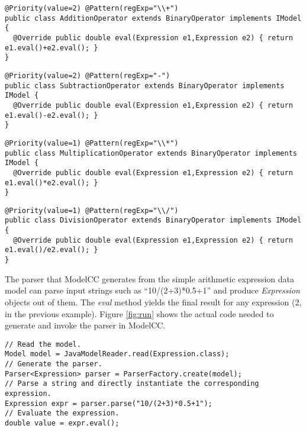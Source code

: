 \documentclass[preprint]{elsarticle}
\newcommand{\sepv}{\vspace{-6.0mm}}
\begin{document}
\begin{figure*}[tb!]
\begin{verbatim}
@Priority(value=2) @Pattern(regExp="\\+")
public class AdditionOperator extends BinaryOperator implements IModel {
  @Override public double eval(Expression e1,Expression e2) { return e1.eval()+e2.eval(); }
}
\end{verbatim}
\sepv
\begin{verbatim}
@Priority(value=2) @Pattern(regExp="-")
public class SubtractionOperator extends BinaryOperator implements IModel {
  @Override public double eval(Expression e1,Expression e2) { return e1.eval()-e2.eval(); }
}
\end{verbatim}
\sepv
\begin{verbatim}
@Priority(value=1) @Pattern(regExp="\\*")
public class MultiplicationOperator extends BinaryOperator implements IModel {
  @Override public double eval(Expression e1,Expression e2) { return e1.eval()*e2.eval(); }
}
\end{verbatim}
\sepv
\begin{verbatim}
@Priority(value=1) @Pattern(regExp="\\/")
public class DivisionOperator extends BinaryOperator implements IModel {
  @Override public double eval(Expression e1,Expression e2) { return e1.eval()/e2.eval(); }
}
\end{verbatim}
\caption{Complete Java implementation of the arithmetic expression interpreter using ModelCC: A set of Java classes define the language ASM,
metadata annotations specify the desired ASM-CSM mapping, and object methods implement arithmetic expression evaluation (2/2).}
\label{fig:calcimmodelcc2}
\end{figure*}

The parser that ModelCC generates from the simple arithmetic expression data model can parse input strings such as ``10/(2+3)*0.5+1'' and produce \emph{Expression} objects out of them.
The \emph{eval} method yields the final result for any expression (2, in the previous example).
Figure \ref{fig:run} shows the actual code needed to generate and invoke the parser in ModelCC.

\begin{figure*}[tb!]
\centering
\begin{verbatim}
// Read the model.
Model model = JavaModelReader.read(Expression.class);
// Generate the parser.
Parser<Expression> parser = ParserFactory.create(model);
// Parse a string and directly instantiate the corresponding expression.
Expression expr = parser.parse("10/(2+3)*0.5+1");
// Evaluate the expression.
double value = expr.eval();
\end{verbatim}
\caption{A code snippet showing how the arithmetic expression parser is generated and invoked.} \label{fig:run}
\end{figure*}
\end{document}
